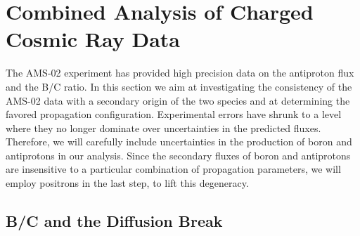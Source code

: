 \documentclass[a4paper,11pt]{article}
\begin{document}
\section{Combined Analysis of Charged Cosmic Ray Data}

The AMS-02 experiment has provided high precision data on the antiproton flux and the B/C ratio. In this section we aim at investigating the consistency of the AMS-02 data with a secondary origin of the two species and at determining the favored propagation configuration. Experimental errors have shrunk to a level where they no longer dominate over uncertainties in the predicted fluxes. Therefore, we will carefully include uncertainties in the production of boron and antiprotons in our analysis. Since the secondary fluxes of boron and antiprotons are insensitive to a particular combination of propagation parameters, we will employ positrons in the last step, to lift this degeneracy.

\subsection{B/C and the Diffusion Break}\label{sec:diffusion_break}
\end{document}
